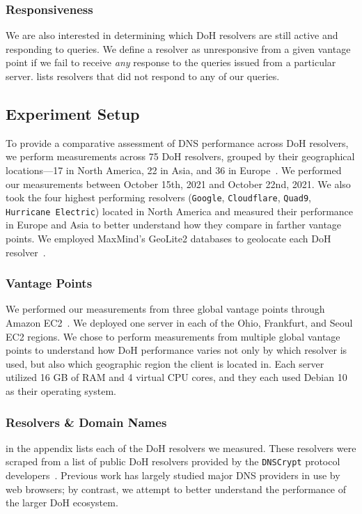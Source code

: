 \subsubsection{Responsiveness}
We are also interested in determining which DoH resolvers are still active and responding to queries.
We define a resolver as unresponsive from a given vantage point if we fail to receive \emph{any} response to the queries issued from a particular server.
 lists resolvers that did not respond to any of our queries.

\subsection{Experiment Setup}
To provide a comparative assessment of DNS performance across DoH resolvers, we perform measurements across 75 DoH resolvers, grouped by their geographical locations—17 in North America, 22 in Asia, and 36 in Europe~\cite{dnscrypt}.
We performed our measurements between October 15th, 2021 and October 22nd, 2021.
We also took the four highest performing resolvers (\texttt{Google}, \texttt{Cloudflare}, \texttt{Quad9}, \texttt{Hurricane Electric}) located in North America and measured their performance in Europe and Asia to better understand how they compare in farther vantage points.  
We employed MaxMind's GeoLite2 databases to geolocate each DoH resolver~\cite{maxmind}.

\subsubsection{Vantage Points}
We performed our measurements from three global vantage points through Amazon EC2~\cite{amazon_ec2}.
We deployed one server in each of the Ohio, Frankfurt, and Seoul EC2 regions.
We chose to perform measurements from multiple global vantage points to understand how DoH performance varies not only by which resolver is used, but also which geographic region the client is located in.
Each server utilized 16 GB of RAM and 4 virtual CPU cores, and they each used Debian 10 as their operating system.

\subsubsection{Resolvers \& Domain Names}
 in the appendix lists each of the DoH resolvers we measured.
These resolvers were scraped from a list of public DoH resolvers provided by the \texttt{DNSCrypt} protocol developers~\cite{dnscrypt-public-resolvers}.
Previous work has largely studied major DNS providers in use by web browsers; by contrast, we attempt to better understand the performance of the larger DoH ecosystem.

